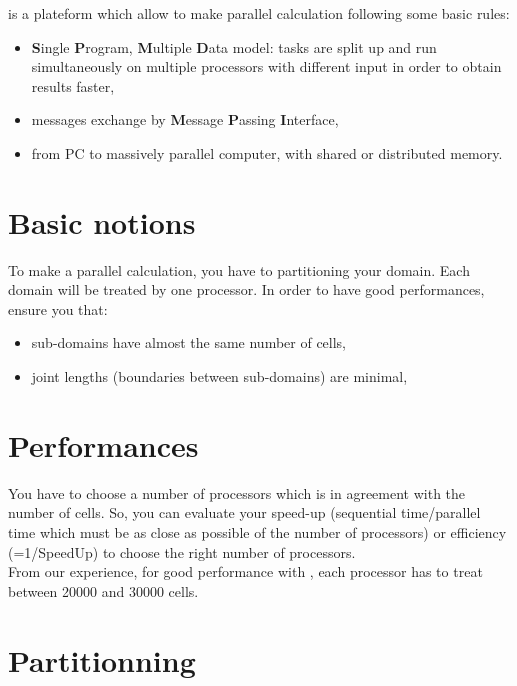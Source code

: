\trust is a plateform which allow to make parallel calculation following some basic rules:
\begin{itemize}
\item \textbf{S}ingle \textbf{P}rogram, \textbf{M}ultiple \textbf{D}ata model: tasks are split up and run simultaneously on multiple processors with different input in order to obtain results faster,
\item messages exchange by \textbf{M}essage \textbf{P}assing \textbf{I}nterface,
\item from PC to massively parallel computer, with shared or distributed memory.
\end{itemize}


\section{Basic notions}
To make a parallel calculation, you have to partitioning your domain.
Each domain will be treated by one processor.
In order to have good performances, ensure you that:
\begin{itemize}
\item sub-domains have almost the same number of cells,
\item joint lengths (boundaries between sub-domains) are minimal,
\end{itemize}



\section{Performances}
You have to choose a number of processors which is in agreement with the number of cells.
So, you can evaluate your speed-up (sequential time/parallel time which must be as close as possible of the number of processors) or efficiency (=1/SpeedUp) to choose the right number of processors.\\

From our experience, for good performance with \trust, each processor has to treat between 20000 and 30000 cells.



\section{Partitionning}

